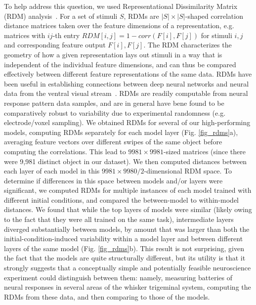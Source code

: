 To help address this question, we used Representational Dissimilarity Matrix (RDM) analysis~\cite{Kriegeskorte2008}.
For a set of stimuli $S$, RDMs are $|S| \times |S|$-shaped correlation distance matrices taken over the feature dimensions of a representation, e.g. matrices with $ij$-th entry $RDM[i, j] = 1 - corr(F[i], F[j])$ for stimuli $i, j$ and corresponding feature output $F[i], F[j]$.
The RDM characterizes the geometry of how a given representation lays out stimuli in a way that is independent of the individual feature dimensions, and can thus be compared effectively between different feature representations of the same data.
RDMs have been useful in establishing connections between deep neural networks and neural data from the ventral visual stream~\cite{cadieu2014deep, Yamins2014, khaligh2014deep}. 
RDMs are readily computable from neural response pattern data samples, and are in general have bene found to be comparatively robust to variability due to experimental randomness (e.g. electrode/voxel sampling).
We obtained RDMs for several of our high-performing models, computing RDMs separately for each model layer (Fig. \ref{fig_rdms}a), averaging feature vectors over different swipes of the same object before computing the correlations.
This lead to $9981\times9981$-sized matrices (since there were 9,981 distinct object in our dataset).
We then computed distances between each layer of each model in this $9981\times9980/2$-dimensional RDM space.
To determine if differences in this space between models and/or layers were significant, we computed RDMs for multiple instances of each model trained with different initial conditions, and compared the between-model to within-model distances.
We found that while the top layers of models were similar (likely owing to the fact that they were all trained on the same task), intermediate layers diverged substantially between models, by amount that was larger than both the initial-condition-induced variability within a model layer and between different layers of the same model (Fig. \ref{fig_rdms}b).
This result is not surprising, given the fact that the models are quite structurally different, but its utility is that it strongly suggests that a conceptually simple and potentially feasible neuroscience experiment could distinguish between them: namely, measuring batteries of neural responses in several areas of the whisker trigeminal system, computing the RDMs from these data, and then comparing to those of the models. 

